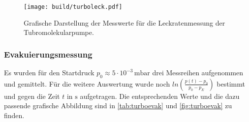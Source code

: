 \begin{figure}[H]
  \centering
  \texttt{[image: build/turboleck.pdf]}
  \caption{Grafische Darstellung der Messwerte für die Leckratenmessung der Tubromolekularpumpe.}
  \label{fig:turboleck}
\end{figure}

\subsubsection{Evakuierungsmessung}
Es wurden für den Startdruck $p_{0} \approx 5\cdot 10^{-3}\,\si{\milli\bar}$ drei Messreihen aufgenommen und
gemittelt. Für die weitere Auswertung wurde noch $ln(\frac{p(t)-p_0}{p_0 - p_E})$ bestimmt und gegen die Zeit
$t$ in $\si{\second}$ aufgetragen. Die entsprechenden Werte und die dazu passende grafische Abbildung sind in
\autoref{tab:turboevak} und \autoref{fig:turboevak} zu finden.

